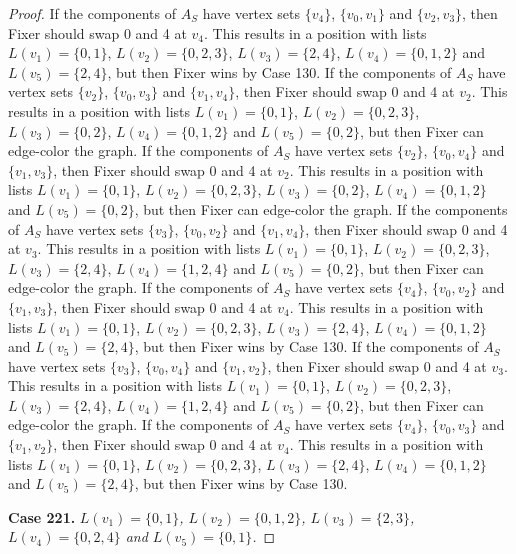 \documentclass[12pt]{amsart}
\theoremstyle{plain}
\theoremstyle{definition}
\theoremstyle{remark}
\begin{document}
\begin{proof}
If the components of $A_S$ have vertex sets $\{v_4\}$, $\{v_0, v_1\}$ and $\{v_2, v_3\}$, then Fixer should swap 0 and 4 at $v_4$. This results in a position with lists $L(v_1) = \{0, 1\}$, $L(v_2) = \{0, 2, 3\}$, $L(v_3) = \{2, 4\}$, $L(v_4) = \{0, 1, 2\}$ and $L(v_5) = \{2, 4\}$, but then Fixer wins by Case 130.
If the components of $A_S$ have vertex sets $\{v_2\}$, $\{v_0, v_3\}$ and $\{v_1, v_4\}$, then Fixer should swap 0 and 4 at $v_2$. This results in a position with lists $L(v_1) = \{0, 1\}$, $L(v_2) = \{0, 2, 3\}$, $L(v_3) = \{0, 2\}$, $L(v_4) = \{0, 1, 2\}$ and $L(v_5) = \{0, 2\}$, but then Fixer can edge-color the graph.
If the components of $A_S$ have vertex sets $\{v_2\}$, $\{v_0, v_4\}$ and $\{v_1, v_3\}$, then Fixer should swap 0 and 4 at $v_2$. This results in a position with lists $L(v_1) = \{0, 1\}$, $L(v_2) = \{0, 2, 3\}$, $L(v_3) = \{0, 2\}$, $L(v_4) = \{0, 1, 2\}$ and $L(v_5) = \{0, 2\}$, but then Fixer can edge-color the graph.
If the components of $A_S$ have vertex sets $\{v_3\}$, $\{v_0, v_2\}$ and $\{v_1, v_4\}$, then Fixer should swap 0 and 4 at $v_3$. This results in a position with lists $L(v_1) = \{0, 1\}$, $L(v_2) = \{0, 2, 3\}$, $L(v_3) = \{2, 4\}$, $L(v_4) = \{1, 2, 4\}$ and $L(v_5) = \{0, 2\}$, but then Fixer can edge-color the graph.
If the components of $A_S$ have vertex sets $\{v_4\}$, $\{v_0, v_2\}$ and $\{v_1, v_3\}$, then Fixer should swap 0 and 4 at $v_4$. This results in a position with lists $L(v_1) = \{0, 1\}$, $L(v_2) = \{0, 2, 3\}$, $L(v_3) = \{2, 4\}$, $L(v_4) = \{0, 1, 2\}$ and $L(v_5) = \{2, 4\}$, but then Fixer wins by Case 130.
If the components of $A_S$ have vertex sets $\{v_3\}$, $\{v_0, v_4\}$ and $\{v_1, v_2\}$, then Fixer should swap 0 and 4 at $v_3$. This results in a position with lists $L(v_1) = \{0, 1\}$, $L(v_2) = \{0, 2, 3\}$, $L(v_3) = \{2, 4\}$, $L(v_4) = \{1, 2, 4\}$ and $L(v_5) = \{0, 2\}$, but then Fixer can edge-color the graph.
If the components of $A_S$ have vertex sets $\{v_4\}$, $\{v_0, v_3\}$ and $\{v_1, v_2\}$, then Fixer should swap 0 and 4 at $v_4$. This results in a position with lists $L(v_1) = \{0, 1\}$, $L(v_2) = \{0, 2, 3\}$, $L(v_3) = \{2, 4\}$, $L(v_4) = \{0, 1, 2\}$ and $L(v_5) = \{2, 4\}$, but then Fixer wins by Case 130.

\noindent\textbf{Case 221.  }\textit{$L(v_1) = \{0, 1\}$, $L(v_2) = \{0, 1, 2\}$, $L(v_3) = \{2, 3\}$, $L(v_4) = \{0, 2, 4\}$ and $L(v_5) = \{0, 1\}$.}


\end{proof}
\end{document}
